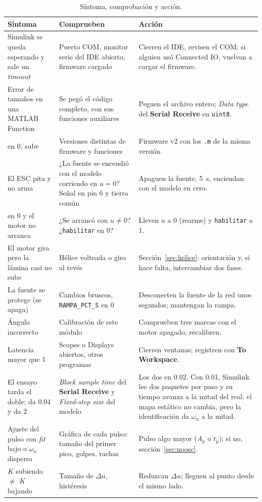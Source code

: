 \documentclass[11pt,letterpaper]{article}
\newcommand{\blq}[1]{\textsf{\textbf{#1}}}                 %
\newcommand{\sen}[1]{\texttt{\detokenize{#1}}}             %
\begin{document}
\begin{table}[H]\centering\small
\caption{Síntoma, comprobación y acción.}\label{tab:problemas}
\begin{tabularx}{\linewidth}{@{}>{\raggedright\arraybackslash}p{3.7cm} >{\raggedright\arraybackslash}p{4.7cm} >{\raggedright\arraybackslash}X@{}}\toprule
\textbf{Síntoma} & \textbf{Comprueben} & \textbf{Acción}\\\midrule
Simulink se queda esperando y sale un \emph{timeout} & Puerto COM, monitor serie del IDE abierto, firmware cargado & Cierren el IDE, revisen el COM; si alguien usó Connected IO, vuelvan a cargar el firmware.\\
Error de tamaños en una MATLAB Function & Se pegó el código completo, con sus funciones auxiliares & Peguen el archivo entero; \emph{Data type} del \blq{Serial Receive} en \texttt{uint8}.\\
\sen{valido} en 0, \sen{n_malos} sube & Versiones distintas de firmware y funciones & Firmware v2 con los \texttt{.m} de la misma versión.\\
El ESC pita y no arma & ¿La fuente se encendió con el modelo corriendo en $u=0$? Señal en pin 6 y tierra común & Apaguen la fuente, 5~s, enciendan con el modelo en cero.\\
\sen{estado} en 0 y el motor no arranca & ¿Se arrancó con $u\ne0$? ¿\texttt{habilitar} en 0? & Lleven $u$ a 0 (rearme) y \texttt{habilitar} a 1.\\
El motor gira pero la lámina casi no sube & Hélice volteada o giro al revés & Sección~\ref{sec:helice}: orientación y, si hace falta, intercambiar dos fases.\\
La fuente se protege (se apaga) & Cambios bruscos, \texttt{RAMPA\_PCT\_S} en 0 & Desconecten la fuente de la red unos segundos; mantengan la rampa.\\
Ángulo incorrecto & Calibración de este módulo & Comprueben tres marcas con el motor apagado; recalibren.\\
Latencia mayor que 1 & Scopes o Displays abiertos, otros programas & Cierren ventanas; registren con \blq{To Workspace}.\\
El ensayo tarda el doble; \sen{diff(t_ard)} da 0.04 y \sen{diff(seq)} da 2 & \emph{Block sample time} del \blq{Serial Receive} y \emph{Fixed-step size} del modelo & Los dos en 0.02. Con 0.01, Simulink lee dos paquetes por paso y su tiempo avanza a la mitad del real: el mapa estático no cambia, pero la identificación da $\omega_n$ a la mitad.\\
Ajuste del pulso con \emph{fit} bajo o $\omega_n$ dispersa & Gráfica de cada pulso: tamaño del primer pico, golpes, rachas & Pulso algo mayor ($A_p$ o $t_p$); si no, sección~\ref{sec:noosc}.\\
$K$ subiendo $\ne$ $K$ bajando & Tamaño de $\Delta u$, histéresis & Reduzcan $\Delta u$; lleguen al punto desde el mismo lado.\\\bottomrule
\end{tabularx}
\end{table}
\end{document}
